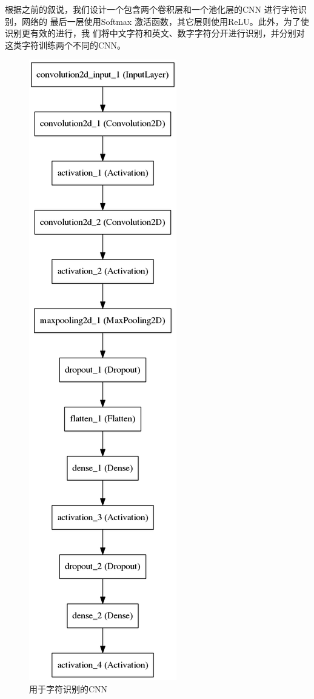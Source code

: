 根据之前的叙说，我们设计一个包含两个卷积层和一个池化层的CNN 进行字符识别，网络的
最后一层使用Softmax 激活函数，其它层则使用ReLU。此外，为了使识别更有效的进行，我
们将中文字符和英文、数字字符分开进行识别，并分别对这类字符训练两个不同的CNN。

\begin{figure}[ht]
  \centering
  \includegraphics[height=\textheight,keepaspectratio]{./Figure/CNNForRecognition.png}
  \caption{用于字符识别的CNN}\label{Fig:CNNForRecog}
\end{figure}

